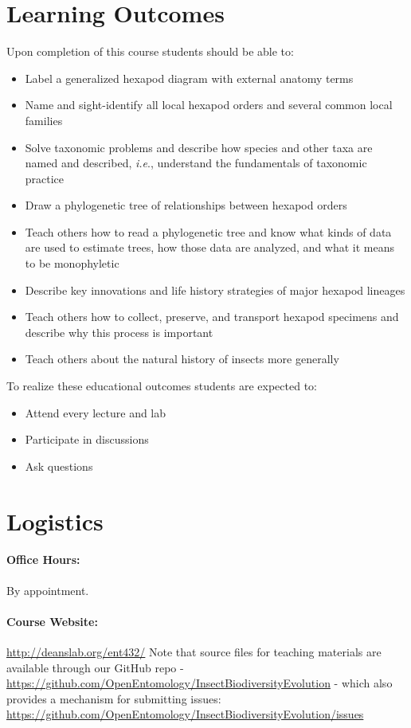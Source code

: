 \documentclass[11pt]{article}
\begin{document}
\section*{Learning Outcomes} 
Upon completion of this course students should be able to:
\begin{itemize}
\item Label a generalized hexapod diagram with external anatomy terms
\item Name and sight-identify all local hexapod orders and several common local families
\item Solve taxonomic problems and describe how species and other taxa are named and described, \textit{i.e}., understand the fundamentals of taxonomic practice
\item Draw a phylogenetic tree of relationships between hexapod orders
\item Teach others how to read a phylogenetic tree and know what kinds of data are used to estimate trees, how those data are analyzed, and what it means to be monophyletic
\item Describe key innovations and life history strategies of major hexapod lineages
\item Teach others how to collect, preserve, and transport hexapod specimens and describe why this process is important
\item Teach others about the natural history of insects more generally
\end{itemize} 

\noindent To realize these educational outcomes students are expected to:
\begin{itemize}
\item Attend every lecture and lab
\item Participate in discussions
\item Ask questions
\end{itemize}

\section*{Logistics} 
\paragraph{Office Hours:} By appointment.

\paragraph{Course Website:} \url{http://deanslab.org/ent432/} Note that source files for teaching materials are available through our GitHub repo - \url{https://github.com/OpenEntomology/InsectBiodiversityEvolution} - which also provides a mechanism for submitting issues:\\ \url{https://github.com/OpenEntomology/InsectBiodiversityEvolution/issues} 
\end{document}

